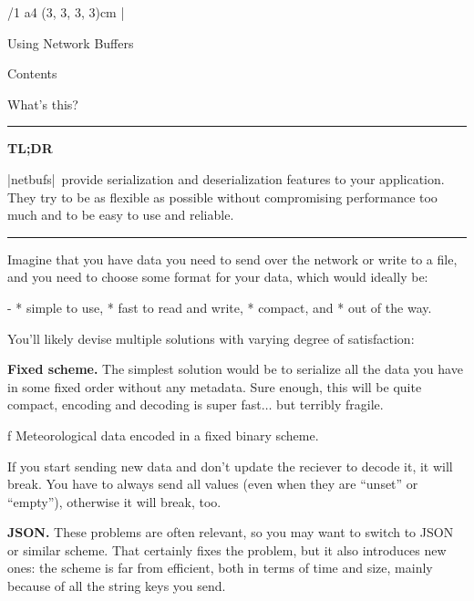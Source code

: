 

\margins/1 a4 (3, 3, 3, 3)cm
\typosize [13/15]
\activettchar|

\def\nb{|netbufs|}

\def\hnote#1#2{
	\medskip
	\hrule
	\medskip
	\par\noindent
	{\bf #1}
	\noindent
	\par\noindent#2
	\medskip
	\hrule
	\medskip
}

\def\img#1#2{
	\bigskip
    \centerline{
		\inspic{#1}
    }
	\caption/f #2
	\bigskip
}

\tit Using Network Buffers

\nonum\notoc\sec Contents
\maketoc

\sec What's this?

\hnote{TL;DR}{%
	\nb\ provide serialization and deserialization features to your application.
	They try to be as flexible as possible without compromising performance too
	much and to be easy to use and reliable.
}

\noindent
Imagine that you have data you need to send over the network or write to a
file, and you
need to choose some format for your data, which would ideally be:

\begitems\style -
	* simple to use,
	* fast to read and write,
	* compact, and
	* out of the way.
\enditems

\noindent
You'll likely devise multiple solutions with varying degree of satisfaction:

{\bf Fixed scheme.} The simplest solution would be to serialize all the data
you have in some fixed order without any metadata. Sure enough, this will be
quite compact, encoding and decoding is super fast$\dots$ but terribly fragile.

\img{images/fixed.pdf}{Meteorological data encoded in a fixed binary scheme.}

If you start sending new data and
don't update the reciever to decode it, it will break. You have to always send
all values (even when they are ``unset'' or ``empty''), otherwise it will break, too.

\noindent
{\bf JSON.} These problems are often relevant, so you may want to
switch to JSON or similar scheme. That certainly fixes the problem, but it also
introduces new ones: the scheme is far from efficient, both in terms of time
and size, mainly because of all the string keys you send.

